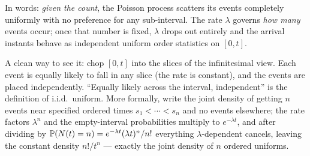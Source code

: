 In words: \emph{given the count}, the Poisson process scatters its events
completely uniformly with no preference for any sub-interval. The rate
$\lambda$ governs \emph{how many} events occur; once that number is fixed,
$\lambda$ drops out entirely and the arrival instants behave as independent
uniform order statistics on $[0,t]$.

\begin{whybox}
A clean way to see it: chop $[0,t]$ into the slices of the infinitesimal view.
Each event is equally likely to fall in any slice (the rate is constant), and the
events are placed independently. ``Equally likely across the interval,
independent'' is the definition of i.i.d.\ uniform. More formally, write the joint
density of getting $n$ events near specified ordered times $s_1<\cdots<s_n$ and no
events elsewhere; the rate factors $\lambda^n$ and the empty-interval
probabilities multiply to $e^{-\lambda t}$, and after dividing by
$\P(N(t)=n)=e^{-\lambda t}(\lambda t)^n/n!$ everything $\lambda$-dependent
cancels, leaving the constant density $n!/t^n$ --- exactly the joint density of
$n$ ordered uniforms.
\end{whybox}


